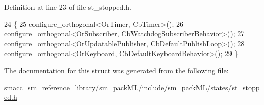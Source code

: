 Definition at line 23 of file st\+\_\+stopped.\+h.


\begin{DoxyCode}
24     \{
25         configure\_orthogonal<OrTimer, CbTimer>();   
26         configure\_orthogonal<OrSubscriber, CbWatchdogSubscriberBehavior>();
27         configure\_orthogonal<OrUpdatablePublisher, CbDefaultPublishLoop>();
28         configure\_orthogonal<OrKeyboard, CbDefaultKeyboardBehavior>();
29     \}
\end{DoxyCode}


The documentation for this struct was generated from the following file\+:\begin{DoxyCompactItemize}
\item 
smacc\+\_\+sm\+\_\+reference\+\_\+library/sm\+\_\+pack\+M\+L/include/sm\+\_\+pack\+M\+L/states/\hyperlink{st__stopped_8h}{st\+\_\+stopped.\+h}\end{DoxyCompactItemize}
